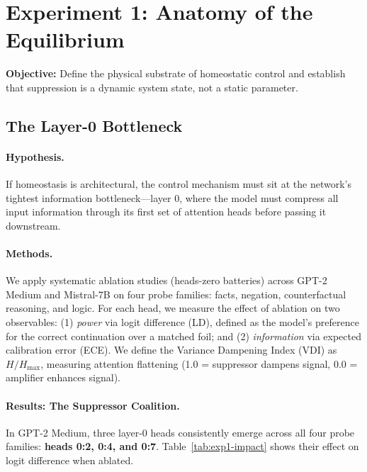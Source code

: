 \section{Experiment 1: Anatomy of the Equilibrium}\label{sec:exp1}

\textbf{Objective:} Define the physical substrate of homeostatic control and establish that suppression is a dynamic system state, not a static parameter.

\subsection{The Layer-0 Bottleneck}

\paragraph{Hypothesis.}
If homeostasis is architectural, the control mechanism must sit at the network's tightest information bottleneck—layer 0, where the model must compress all input information through its first set of attention heads before passing it downstream.

\paragraph{Methods.}
We apply systematic ablation studies (heads-zero batteries) across GPT-2 Medium and Mistral-7B on four probe families: facts, negation, counterfactual reasoning, and logic. For each head, we measure the effect of ablation on two observables: (1) \emph{power} via logit difference (LD), defined as the model's preference for the correct continuation over a matched foil; and (2) \emph{information} via expected calibration error (ECE). We define the Variance Dampening Index (VDI) as $H/H_{\text{max}}$, measuring attention flattening (1.0 = suppressor dampens signal, 0.0 = amplifier enhances signal).

\paragraph{Results: The Suppressor Coalition.}
In GPT-2 Medium, three layer-0 heads consistently emerge across all four probe families: \textbf{heads 0:2, 0:4, and 0:7}. Table~\ref{tab:exp1-impact} shows their effect on logit difference when ablated.

